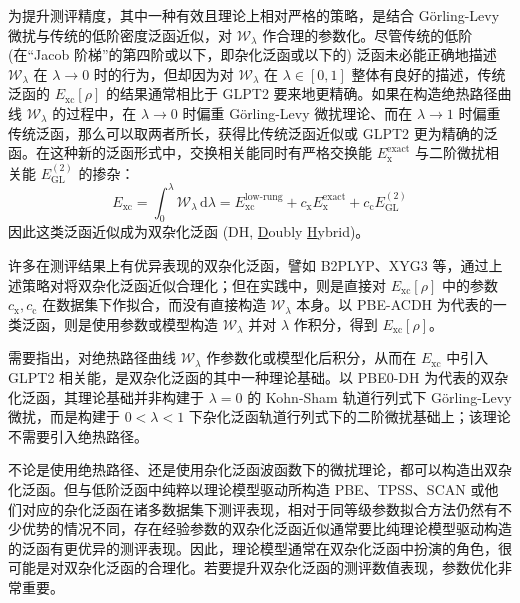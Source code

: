 为提升测评精度，其中一种有效且理论上相对严格的策略，是结合 G\"orling-Levy 微扰与传统的低阶密度泛函近似，对 $\mathcal{W}_{\lambda}$ 作合理的参数化。尽管传统的低阶 (在“Jacob 阶梯”的第四阶或以下，即杂化泛函或以下的) 泛函未必能正确地描述 $\mathcal{W}_{\lambda}$ 在 $\lambda \rightarrow 0$ 时的行为，但却因为对 $\mathcal{W}_{\lambda}$ 在 $\lambda \in [0, 1]$ 整体有良好的描述，传统泛函的 $E_\mathrm{xc} [\rho]$ 的结果通常相比于 GLPT2 要来地更精确。如果在构造绝热路径曲线 $\mathcal{W}_{\lambda}$ 的过程中，在 $\lambda \rightarrow 0$ 时偏重 G\"orling-Levy 微扰理论、而在 $\lambda \rightarrow 1$ 时偏重传统泛函，那么可以取两者所长，获得比传统泛函近似或 GLPT2 更为精确的泛函。在这种新的泛函形式中，交换相关能同时有严格交换能 $E_\mathrm{x}^\mathrm{exact}$ 与二阶微扰相关能 $E_\mathrm{GL}^{(2)}$ 的掺杂：
\begin{equation}
  E_\mathrm{xc} = \int_0^\lambda \mathcal{W}_{\lambda} \, \mathrm{d} \lambda = E_\mathrm{xc}^\text{low-rung} + c_\mathrm{x} E_\mathrm{x}^\mathrm{exact} + c_\mathrm{c} E_\mathrm{GL}^{(2)}
\end{equation}
因此这类泛函近似成为双杂化泛函 (DH, \underline{D}oubly \underline{H}ybrid)。

许多在测评结果上有优异表现的双杂化泛函，譬如 B2PLYP、XYG3 等，通过上述策略对将双杂化泛函近似合理化\cite{Grimme-Grimme.JCP.2006, Zhang-Goddard.PNAS.2009}；但在实践中，则是直接对 $E_\mathrm{xc} [\rho]$ 中的参数 $c_\mathrm{x}, c_\mathrm{c}$ 在数据集下作拟合，而没有直接构造 $\mathcal{W}_{\lambda}$ 本身。以 PBE-ACDH\cite{Su-Xu.JCP.2014} 为代表的一类泛函，则是使用参数或模型构造 $\mathcal{W}_{\lambda}$ 并对 $\lambda$ 作积分，得到 $E_\mathrm{xc} [\rho]$。

需要指出，对绝热路径曲线 $\mathcal{W}_{\lambda}$ 作参数化或模型化后积分，从而在 $E_\mathrm{xc}$ 中引入 GLPT2 相关能，是双杂化泛函的其中一种理论基础。以 PBE0-DH\cite{Toulouse-Adamo.JCP.2011} 为代表的双杂化泛函，其理论基础并非构建于 $\lambda = 0$ 的 Kohn-Sham 轨道行列式下 G\"orling-Levy 微扰，而是构建于 $0 < \lambda < 1$ 下杂化泛函轨道行列式下的二阶微扰基础上\cite{Sharkas-Savin.JCP.2011}；该理论不需要引入绝热路径。

不论是使用绝热路径、还是使用杂化泛函波函数下的微扰理论，都可以构造出双杂化泛函。但与低阶泛函中纯粹以理论模型驱动所构造 PBE、TPSS、SCAN 或他们对应的杂化泛函在诸多数据集下测评表现，相对于同等级参数拟合方法仍然有不少优势\cite{Goerigk-Grimme.PCCP.2017, Medvedev-Lyssenko.S.2017}的情况不同，存在经验参数的双杂化泛函近似通常要比纯理论模型驱动构造的泛函有更优异的测评表现\cite{Mehta-Goerigk.PCCP.2018}。因此，理论模型通常在双杂化泛函中扮演的角色，很可能是对双杂化泛函的合理化。若要提升双杂化泛函的测评数值表现，参数优化非常重要。

